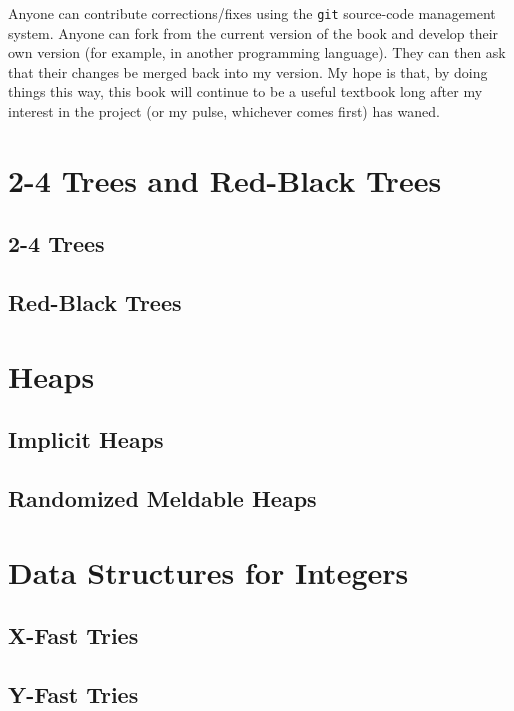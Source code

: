 \documentclass[11pt]{book}
\begin{document}
Anyone can contribute corrections/fixes using the \texttt{git} source-code
management system.  Anyone can fork from the current version of the
book and develop their own version (for example, in another programming
language).  They can then ask that their changes be merged back into
my version.  My hope is that, by doing things this way, this book will
continue to be a useful textbook long after my interest in the project
(or my pulse, whichever comes first) has waned.











\chapter{2-4 Trees and Red-Black Trees}
\section{2-4 Trees}
\section{Red-Black Trees}

\chapter{Heaps}
\section{Implicit Heaps}
\section{Randomized Meldable Heaps}

\chapter{Data Structures for Integers}
\section{X-Fast Tries}
\section{Y-Fast Tries}
\end{document}
